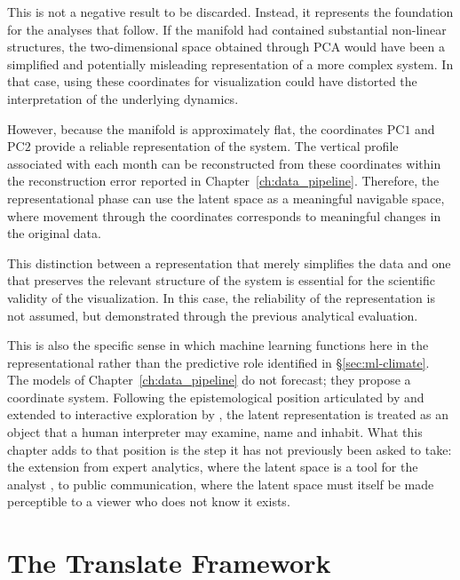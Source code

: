 This is not a negative result to be discarded. Instead, it represents the foundation for the analyses that follow. If the manifold had contained substantial non-linear structures, the two-dimensional space obtained through PCA would have been a simplified and potentially misleading representation of a more complex system. In that case, using these coordinates for visualization could have distorted the interpretation of the underlying dynamics.

However, because the manifold is approximately flat, the coordinates $\mathrm{PC1}$ and $\mathrm{PC2}$ provide a reliable representation of the system. The vertical profile associated with each month can be reconstructed from these coordinates within the reconstruction error reported in Chapter~\ref{ch:data_pipeline}. Therefore, the representational phase can use the latent space as a meaningful navigable space, where movement through the coordinates corresponds to meaningful changes in the original data.

This distinction between a representation that merely simplifies the data and one that preserves the relevant structure of the system is essential for the scientific validity of the visualization. In this case, the reliability of the representation is not assumed, but demonstrated through the previous analytical evaluation.

This is also the specific sense in which machine learning functions here in the representational rather than the predictive role identified in §\ref{sec:ml-climate}. The models of Chapter~\ref{ch:data_pipeline} do not forecast; they propose a coordinate system. Following the epistemological position articulated by \citet{iten2020} and extended to interactive exploration by \citet{camps2019}, the latent representation is treated as an object that a human interpreter may examine, name and inhabit. What this chapter adds to that position is the step it has not previously been asked to take: the extension from expert analytics, where the latent space is a tool for the analyst \citep{sacha2018}, to public communication, where the latent space must itself be made perceptible to a viewer who does not know it exists.

\section{The Translate Framework}
\label{sec:translate-framework}

